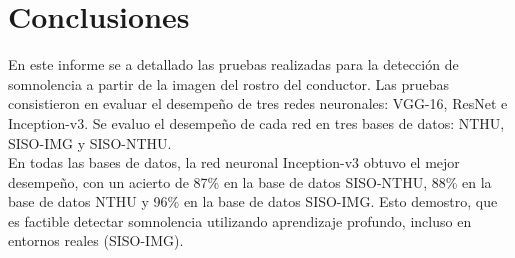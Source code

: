 \documentclass{article}
\begin{document}
	
	\section{Conclusiones}
	En este informe se a detallado las pruebas realizadas para la detección de somnolencia a partir de la imagen del rostro del conductor. Las pruebas consistieron en evaluar el desempeño de tres redes neuronales: VGG-16, ResNet e Inception-v3. Se evaluo el desempeño de cada red en tres bases de datos: NTHU, SISO-IMG y SISO-NTHU.\\
	
	En todas las bases de datos, la red neuronal Inception-v3 obtuvo el mejor desempeño, con un acierto de 87\% en la base de datos SISO-NTHU, 88\% en la base de datos NTHU y 96\% en la base de datos SISO-IMG. Esto demostro, que es factible detectar somnolencia utilizando aprendizaje profundo, incluso en entornos reales (SISO-IMG).\\


	
\end{document}
